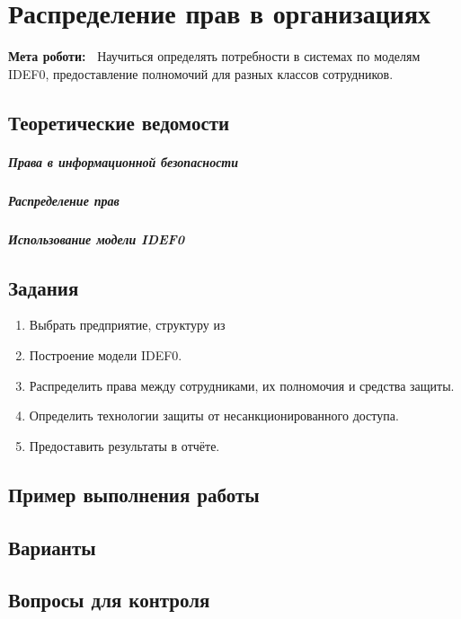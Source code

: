 \chapter{Распределение прав в организациях} \label{chapt6}%
\textbf{Мета роботи:~}%
Научиться определять потребности в системах по моделям IDEF0, предоставление
полномочий для разных классов сотрудников.
\section{Теоретические ведомости} \label{sect5_a}
%
\paragraph{Права в информационной безопасности}

\paragraph{Распределение прав}

\paragraph{Использование модели IDEF0}

\section{Задания}\label{sect5_b}
%
\begin{enumerate}
  \item Выбрать предприятие, структуру из 
  \item Построение модели IDEF0.
  \item Распределить права между сотрудниками, их полномочия и средства
      защиты.
  \item Определить технологии защиты от несанкционированного доступа.
  \item Предоставить результаты в отчёте.
\end{enumerate}
\section{Пример выполнения работы}\label{sect5_c}
%
\section{Варианты}\label{sect5_d}
%
\section{Вопросы для контроля}\label{sect5_e}
%
